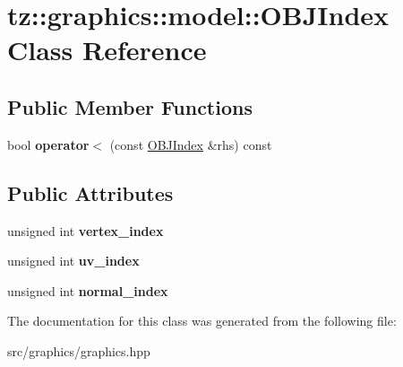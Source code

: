 \hypertarget{classtz_1_1graphics_1_1model_1_1_o_b_j_index}{}\section{tz\+:\+:graphics\+:\+:model\+:\+:O\+B\+J\+Index Class Reference}
\label{classtz_1_1graphics_1_1model_1_1_o_b_j_index}
\subsection*{Public Member Functions}
\begin{DoxyCompactItemize}
\item 
\mbox{\label{classtz_1_1graphics_1_1model_1_1_o_b_j_index_a5bf098fe36d35780bfb094343361ff83}} 
bool {\bfseries operator$<$} (const \mbox{\hyperlink{classtz_1_1graphics_1_1model_1_1_o_b_j_index}{O\+B\+J\+Index}} \&rhs) const
\end{DoxyCompactItemize}
\subsection*{Public Attributes}
\begin{DoxyCompactItemize}
\item 
\mbox{\label{classtz_1_1graphics_1_1model_1_1_o_b_j_index_a9a846338dd6bad77791041f17545dc01}} 
unsigned int {\bfseries vertex\+\_\+index}
\item 
\mbox{\label{classtz_1_1graphics_1_1model_1_1_o_b_j_index_a9b8794bf6a6414055c2ca0b344e23bab}} 
unsigned int {\bfseries uv\+\_\+index}
\item 
\mbox{\label{classtz_1_1graphics_1_1model_1_1_o_b_j_index_a75ae0aff1539b1d346f3114478e6037d}} 
unsigned int {\bfseries normal\+\_\+index}
\end{DoxyCompactItemize}


The documentation for this class was generated from the following file\+:\begin{DoxyCompactItemize}
\item 
src/graphics/graphics.\+hpp\end{DoxyCompactItemize}
